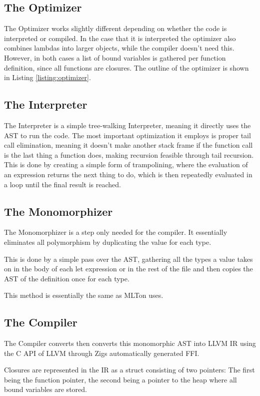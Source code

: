 \documentclass[12pt]{article}
\newcommand{\importListing}[1]{
    \begin{minipage}{\linewidth}
    
    \end{minipage}
}
\begin{document}
\subsection{The Optimizer}
\importListing{code/optimizer.tex}

The Optimizer works slightly different depending on whether
the code is interpreted or compiled. In the case that it is interpreted
the optimizer also combines lambdas into larger objects,
while the compiler doesn't need this. However, in both cases
a list of bound variables is gathered per function definition,
since all functions are closures.
The outline of the optimizer is shown in Listing \ref{listing:optimizer}.

\subsection{The Interpreter}
The Interpreter is a simple tree-walking Interpreter,
meaning it directly uses the AST to run the code.
The most important optimization it employs is proper tail call elimination,
meaning it doesn't make another stack frame if the function call is the last
thing a function does, making recursion feasible through
tail recursion. This is done by creating a simple form of trampolining,
where the evaluation of an expression returns the next thing to
do, which is then repeatedly evaluated in a loop until the final result
is reached.

\subsection{The Monomorphizer}
The Monomorphizer is a step only needed for the compiler.
It essentially eliminates all polymorphism by duplicating
the value for each type.

This is done by a simple pass over the AST, gathering
all the types a value takes on in the body of each let expression
or in the rest of the file and then copies the AST of the definition once for each
type.

This method is essentially the same as MLTon uses.\autocite{Monomorphise}

\subsection{The Compiler}
The Compiler converts then converts this
monomorphic AST into LLVM IR using the C API of LLVM through
Zigs automatically generated FFI.

Closures are represented in the IR as a struct consisting of two pointers:
The first being the function pointer, the second being a pointer to the heap
where all bound variables are stored.
\end{document}
